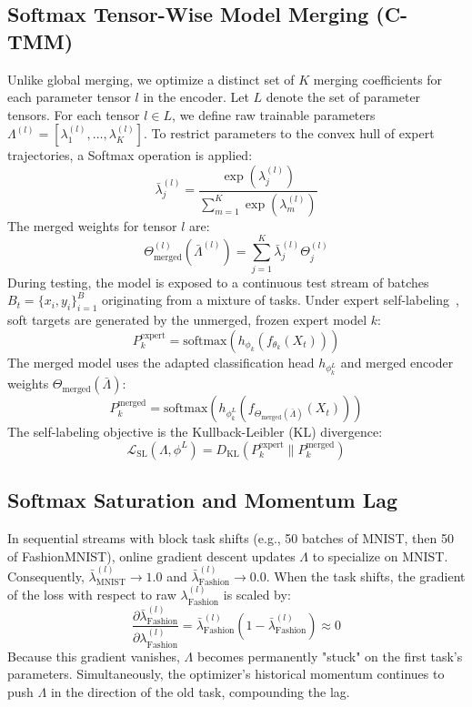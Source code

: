 \documentclass{article}
\theoremstyle{plain}
\theoremstyle{definition}
\theoremstyle{remark}
\begin{document}
\subsection{Softmax Tensor-Wise Model Merging (C-TMM)}
Unlike global merging, we optimize a distinct set of $K$ merging coefficients for each parameter tensor $l$ in the encoder. Let $L$ denote the set of parameter tensors. For each tensor $l \in L$, we define raw trainable parameters $\Lambda^{(l)} = [\lambda^{(l)}_1, \dots, \lambda^{(l)}_K]$. To restrict parameters to the convex hull of expert trajectories, a Softmax operation is applied:
\begin{equation}
\bar{\lambda}^{(l)}_j = \frac{\exp(\lambda^{(l)}_j)}{\sum_{m=1}^K \exp(\lambda^{(l)}_m)}
\end{equation}
The merged weights for tensor $l$ are:
\begin{equation}
\Theta^{(l)}_{\text{merged}}(\bar{\Lambda}^{(l)}) = \sum_{j=1}^K \bar{\lambda}^{(l)}_j \Theta^{(l)}_j
\end{equation}
During testing, the model is exposed to a continuous test stream of batches $B_t = \{x_i, y_i\}_{i=1}^B$ originating from a mixture of tasks. Under expert self-labeling~\cite{jung2025symerge}, soft targets are generated by the unmerged, frozen expert model $k$:
\begin{equation}
P^{\text{expert}}_k = \text{softmax}(h_{\phi_k}(f_{\theta_k}(X_t)))
\end{equation}
The merged model uses the adapted classification head $h_{\phi^L_k}$ and merged encoder weights $\Theta_{\text{merged}}(\bar{\Lambda})$:
\begin{equation}
P^{\text{merged}}_k = \text{softmax}(h_{\phi^L_k}(f_{\Theta_{\text{merged}}(\bar{\Lambda})}(X_t)))
\end{equation}
The self-labeling objective is the Kullback-Leibler (KL) divergence:
\begin{equation}
\mathcal{L}_{\text{SL}}(\Lambda, \phi^L) = D_{\text{KL}}(P^{\text{expert}}_k \parallel P^{\text{merged}}_k)
\end{equation}

\subsection{Softmax Saturation and Momentum Lag}
In sequential streams with block task shifts (e.g., 50 batches of MNIST, then 50 of FashionMNIST), online gradient descent updates $\Lambda$ to specialize on MNIST. Consequently, $\bar{\lambda}^{(l)}_{\text{MNIST}} \to 1.0$ and $\bar{\lambda}^{(l)}_{\text{Fashion}} \to 0.0$.
When the task shifts, the gradient of the loss with respect to raw $\lambda^{(l)}_{\text{Fashion}}$ is scaled by:
\begin{equation}
\frac{\partial \bar{\lambda}^{(l)}_{\text{Fashion}}}{\partial \lambda^{(l)}_{\text{Fashion}}} = \bar{\lambda}^{(l)}_{\text{Fashion}} (1 - \bar{\lambda}^{(l)}_{\text{Fashion}}) \approx 0
\end{equation}
Because this gradient vanishes, $\Lambda$ becomes permanently "stuck" on the first task's parameters. Simultaneously, the optimizer's historical momentum continues to push $\Lambda$ in the direction of the old task, compounding the lag.
\end{document}
